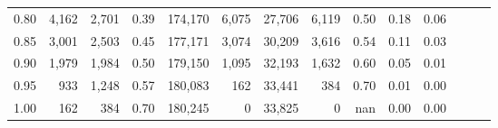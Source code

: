 \begin{tabular}{rrrrrrrrrrrrrr}
0.80 &   4,162 &  2,701 &  0.39 &  174,170 &    6,075 &  27,706 &   6,119 &  0.50 &  0.18 &      0.06 \\
0.85 &   3,001 &  2,503 &  0.45 &  177,171 &    3,074 &  30,209 &   3,616 &  0.54 &  0.11 &      0.03 \\
0.90 &   1,979 &  1,984 &  0.50 &  179,150 &    1,095 &  32,193 &   1,632 &  0.60 &  0.05 &      0.01 \\
0.95 &     933 &  1,248 &  0.57 &  180,083 &      162 &  33,441 &     384 &  0.70 &  0.01 &      0.00 \\
1.00 &     162 &    384 &  0.70 &  180,245 &        0 &  33,825 &       0 &   nan &  0.00 &      0.00 \\
\bottomrule
\end{tabular}
